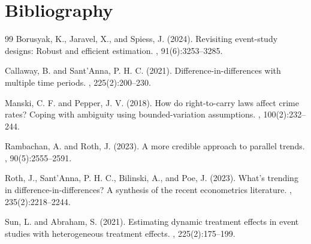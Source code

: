 \documentclass[11pt]{article}
\theoremstyle{definition}
\theoremstyle{plain}
\theoremstyle{remark}
\begin{document}
\section*{Bibliography}
\begin{thebibliography}{99}
Borusyak, K., Jaravel, X., and Spiess, J. (2024).
\newblock Revisiting event-study designs: Robust and efficient estimation.
, 91(6):3253--3285.

Callaway, B. and Sant'Anna, P. H. C. (2021).
\newblock Difference-in-differences with multiple time periods.
, 225(2):200--230.

Manski, C. F. and Pepper, J. V. (2018).
\newblock How do right-to-carry laws affect crime rates? Coping with ambiguity using bounded-variation assumptions.
, 100(2):232--244.

Rambachan, A. and Roth, J. (2023).
\newblock A more credible approach to parallel trends.
, 90(5):2555--2591.

Roth, J., Sant'Anna, P. H. C., Bilinski, A., and Poe, J. (2023).
\newblock What's trending in difference-in-differences? A synthesis of the recent econometrics literature.
, 235(2):2218--2244.

Sun, L. and Abraham, S. (2021).
\newblock Estimating dynamic treatment effects in event studies with heterogeneous treatment effects.
, 225(2):175--199.
\end{thebibliography}
\end{document}
